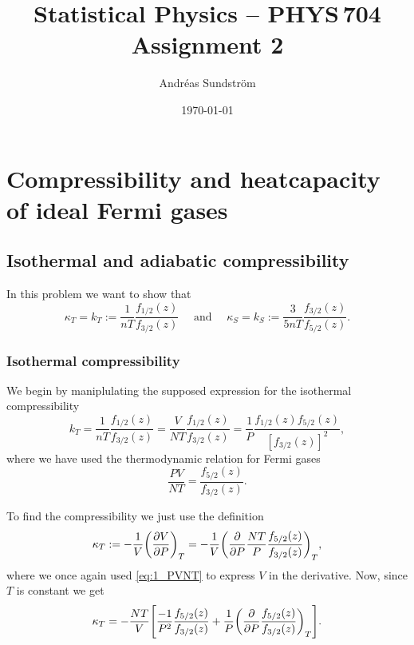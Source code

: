 \documentclass[11pt,letter, swedish, english
]{article}
\begin{document}
\title{Statistical Physics -- PHYS\,704 \\
Assignment 2}
\author{Andréas Sundström}
\date{\today}

\maketitle



\section{Compressibility and heatcapacity of ideal Fermi gases}
\subsection{Isothermal and adiabatic compressibility}
In this problem we want to show that
\begin{equation}
\kappa_T = k_T:=\frac{1}{nT}\frac{f_{1/2}(z)}{f_{3/2}(z)}
\quad\text{ and }\quad
\kappa_S = k_S:=\frac{3}{5nT}\frac{f_{3/2}(z)}{f_{5/2}(z)}.
\end{equation}


\subsubsection{Isothermal compressibility}
We begin by maniplulating the supposed expression for the isothermal
compressibility
\begin{equation}\label{eq:1_want_this}
k_T=\frac{1}{nT}\frac{f_{1/2}(z)}{f_{3/2}(z)}
= \frac{V}{NT}\frac{f_{1/2}(z)}{f_{3/2}(z)}
= \frac{1}{P}\frac{f_{1/2}(z)f_{5/2}(z)}{[f_{3/2}(z)]^2},
\end{equation}
where we have used the thermodynamic relation for Fermi gases
\begin{equation}\label{eq:1_PVNT}
\frac{PV}{NT}=\frac{f_{5/2}(z)}{f_{3/2}(z)}.
\end{equation}

To find the compressibility we just use the definition
\begin{equation}
\kappa_T:=-\frac{1}{V}\qty(\pdv{V}{P})_T
= -\frac{1}{V} \qty(\pdv{P} \frac{NT}{P}\frac{f_{5/2}(z)}{f_{3/2}(z)})_T,
\end{equation}
where we once again used \eqref{eq:1_PVNT} to express $V$ in the
derivative. Now, since $T$ is constant we get
\begin{equation}\label{eq:1_k_T_2}
\kappa_T
= -\frac{NT}{V} \qty[
\frac{-1}{P^2}\frac{f_{5/2}(z)}{f_{3/2}(z)}
+\frac{1}{P}\qty(\pdv{P}
\frac{f_{5/2}(z)}{f_{3/2}(z)}
)_T].
\end{equation}
\end{document}

